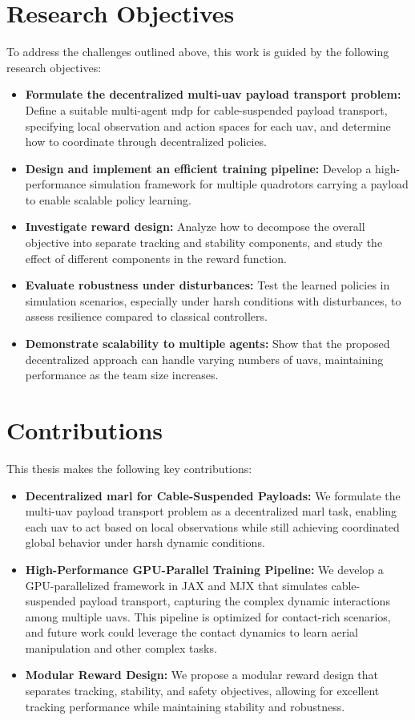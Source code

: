 \section{Research Objectives}
To address the challenges outlined above, this work is guided by the following research objectives:
\begin{itemize}
    \item \textbf{Formulate the decentralized multi-\gls{uav} payload transport problem:} Define a suitable multi-agent \gls{mdp} for cable-suspended payload transport, specifying local observation and action spaces for each \gls{uav}, and determine how to coordinate through decentralized policies.
    \item \textbf{Design and implement an efficient training pipeline:} Develop a high-performance simulation framework for multiple quadrotors carrying a payload to enable scalable policy learning.
    \item \textbf{Investigate reward design:} Analyze how to decompose the overall objective into separate tracking and stability components, and study the effect of different components in the reward function.
    \item \textbf{Evaluate robustness under disturbances:} Test the learned policies in simulation scenarios, especially under harsh conditions with disturbances, to assess resilience compared to classical controllers.
    \item \textbf{Demonstrate scalability to multiple agents:} Show that the proposed decentralized approach can handle varying numbers of \glspl{uav}, maintaining performance as the team size increases.
\end{itemize}
\section{Contributions}
This thesis makes the following key contributions:
\begin{itemize}
    \item \textbf{Decentralized \gls{marl} for Cable-Suspended Payloads:} We formulate the multi-\gls{uav} payload transport problem as a decentralized \gls{marl} task, enabling each \gls{uav} to act based on local observations while still achieving coordinated global behavior under harsh dynamic conditions.
    \item \textbf{High-Performance GPU-Parallel Training Pipeline:} We develop a GPU-parallelized framework in JAX and MJX that simulates cable-suspended payload transport, capturing the complex dynamic interactions among multiple \glspl{uav}. This pipeline is optimized for contact-rich scenarios, and future work could leverage the contact dynamics to learn aerial manipulation and other complex tasks.
    \item \textbf{Modular Reward Design:} We propose a modular reward design that separates tracking, stability, and safety objectives, allowing for excellent tracking performance while maintaining stability and robustness. 
\end{itemize}

